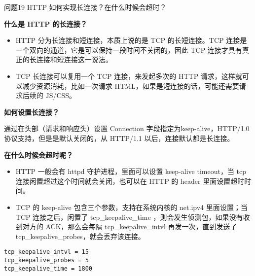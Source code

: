 \documentclass[cn,11pt,color=blue,lang=cn]{elegantbook}
\begin{document}
\begin{custom}{问题19}
HTTP 如何实现长连接？在什么时候会超时？
\end{custom}
\begin{solution}
\begin{note} \textbf{什么是 HTTP 的长连接？} \end{note}

\begin{itemize}
	\item HTTP 分为长连接和短连接，本质上说的是 TCP 的长短连接。TCP 连接是一个双向的通道，它是可以保持一段时间不关闭的，因此 TCP 连接才具有真正的长连接和短连接这一说法。
	\item TCP 长连接可以复用一个 TCP 连接，来发起多次的 HTTP 请求，这样就可以减少资源消耗，比如一次请求 HTML，如果是短连接的话，可能还需要请求后续的 JS/CSS。
\end{itemize}

\begin{note} \textbf{如何设置长连接？} \end{note}
通过在头部（请求和响应头）设置 Connection 字段指定为keep-alive，HTTP/1.0 协议支持，但是是默认关闭的，从 HTTP/1.1 以后，连接默认都是长连接。

\begin{note} \textbf{在什么时候会超时呢？} \end{note}

\begin{itemize}
	\item HTTP 一般会有 httpd 守护进程，里面可以设置 keep-alive timeout，当 tcp 连接闲置超过这个时间就会关闭，也可以在 HTTP 的 header 里面设置超时时间。

	\item TCP 的 keep-alive 包含三个参数，支持在系统内核的 net.ipv4 里面设置；当 TCP 连接之后，闲置了 tcp\_keepalive\_time ，则会发生侦测包，如果没有收到对方的 ACK，那么会每隔 tcp\_keepalive\_intvl 再发一次，直到发送了 tcp\_keepalive\_probes，就会丢弃该连接。
\end{itemize}
\begin{lstlisting}
tcp_keepalive_intvl = 15
tcp_keepalive_probes = 5
tcp_keepalive_time = 1800
\end{lstlisting}

\end{solution}
\end{document}
